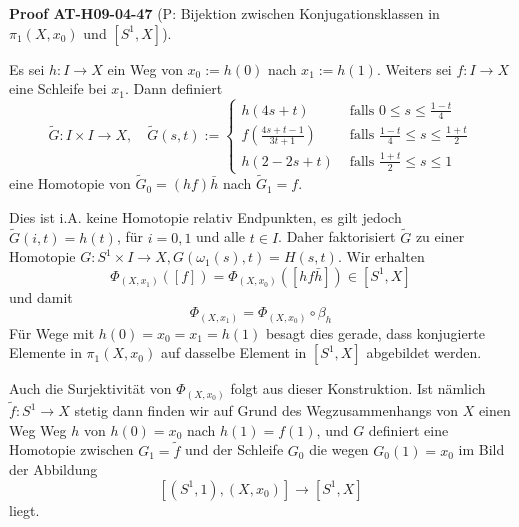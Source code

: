 \documentclass[10pt, letterpaper]{article}
\newcommand{\CustomHeading}[3]{%
  \par\medskip\noindent%
  \textbf{#1 #2} \textnormal{(#3)}.\enskip%
}
\newenvironment{PROOF}[2]{\begin{unitbox}\CustomHeading{Proof}{#1}{#2}}{\end{unitbox}}
\begin{document}
\begin{PROOF}{AT-H09-04-47}{P: Bijektion zwischen Konjugationsklassen in $\pi_1\left(X, x_0\right)$ und $\left[S^1, X\right]$}
Es sei $h: I \rightarrow X$ ein Weg von $x_0:=h(0)$ nach $x_1:=h(1)$. Weiters sei $f: I \rightarrow X$ eine Schleife bei $x_1$. Dann definiert
$$
\tilde{G}: I \times I \rightarrow X, \quad \tilde{G}(s, t):= \begin{cases}h(4 s+t) & \text { falls } 0 \leq s \leq \frac{1-t}{4} \\ f\left(\frac{4 s+t-1}{3 t+1}\right) & \text { falls } \frac{1-t}{4} \leq s \leq \frac{1+t}{2} \\ h(2-2 s+t) & \text { falls } \frac{1+t}{2} \leq s \leq 1\end{cases}
$$
eine Homotopie von $\tilde{G}_0=(h f) \bar{h}$ nach $\tilde{G}_1=f$. 

Dies ist i.A. keine Homotopie relativ Endpunkten, es gilt jedoch $\tilde{G}(i, t)=h(t)$, für $i=0,1$ und alle $t \in I$. Daher faktorisiert $\tilde{G}$ zu einer Homotopie $G: S^1 \times I \rightarrow X, G\left(\omega_1(s), t\right)=H(s, t)$. Wir erhalten 
$$\Phi_{\left(X, x_1\right)}([f])=\Phi_{\left(X, x_0\right)}([h f \bar{h}]) \in\left[S^1, X\right]$$ 
und damit 
$$\Phi_{\left(X, x_1\right)}=\Phi_{\left(X, x_0\right)} \circ \beta_h$$ 
Für Wege mit $h(0)=x_0=x_1=h(1)$ besagt dies gerade, dass konjugierte Elemente in $\pi_1\left(X, x_0\right)$ auf dasselbe Element in $\left[S^1, X\right]$ abgebildet werden. 

Auch die Surjektivität von $\Phi_{\left(X, x_0\right)}$ folgt aus dieser Konstruktion. Ist nämlich $\tilde{f}: S^1 \rightarrow X$ stetig dann finden wir auf Grund des Wegzusammenhangs von $X$ einen Weg Weg $h$ von $h(0)=x_0$ nach $h(1)=f(1)$, und $G$ definiert eine Homotopie zwischen $G_1=\tilde{f}$ und der Schleife $G_0$ die wegen $G_0(1)=x_0$ im Bild der Abbildung 
$$\left[\left(S^1, 1\right),\left(X, x_0\right)\right] \rightarrow\left[S^1, X\right]$$ 
liegt. 


\end{PROOF}
\end{document}
